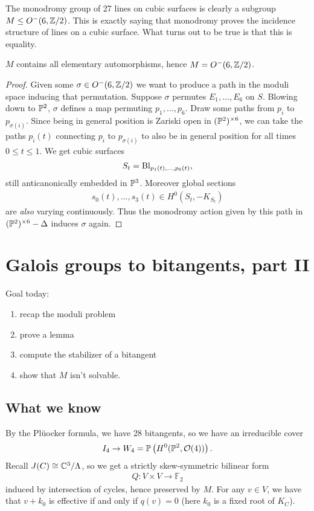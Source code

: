 \documentclass[11pt]{amsart}
\begin{document}
The monodromy group of 27 lines on cubic surfaces is clearly a subgroup $M \le O^-(6,\Z/2)$. This is exactly saying that monodromy proves the incidence structure of lines on a cubic surface. What turns out to be true is that this is equality.

\begin{theorem} $M$ contains all elementary automorphisms, hence $M = O^-(6,\Z/2)$.
\end{theorem}
\begin{proof} Given some $\sigma \in O^-(6,\Z/2)$ we want to produce a path in the moduli space inducing that permutation. Suppose $\sigma$ permutes $E_1, \ldots, E_6$ on $S$. Blowing down to $\P^2$, $\sigma$ defines a map permuting $p_1, \ldots, p_6$. Draw some paths from $p_i$ to $p_{\sigma(i)}$. Since being in general position is Zariski open in $(\P^2)^{\times6}$, we can take the paths $p_i(t)$ connecting $p_i$ to $p_{\sigma(i)}$ to also be in general position for all times $0\le t \le 1$. We get cubic surfaces
\begin{align*}
    S_t = \Bl_{p_1(t), \ldots, p_6(t)},
\end{align*}
still anticanonically embedded in $\P^3$. Moreover global sections 
\begin{align*}
    s_0(t), \ldots, s_3(t) \in H^0(S_t, -K_{S_t})
\end{align*}
are \textit{also} varying continuously. Thus the monodromy action given by this path in $(\P^2)^{\times6}-\Delta$ induces $\sigma$ again.
\end{proof}


\section{Galois groups to bitangents, part II}

Goal today:
\begin{enumerate}
    \item recap the moduli problem
    \item prove a lemma
    \item compute the stabilizer of a bitangent
    \item show that $M$ isn't solvable.
\end{enumerate}

\subsection{What we know}

By the Pl\"{u}ocker formula, we have 28 bitangents, so we have an irreducible cover
\begin{align*}
    I_4 \to W_4 = \mathbb{P} \left( H^0(\P^2, \O(4)) \right).
\end{align*}
Recall $J(C)\cong \C^3/\Lambda$, so we get a strictly skew-symmetric bilinear form
\begin{align*}
    Q \colon V \times V \to \mathbb{F}_2
\end{align*}
induced by intersection of cycles, hence preserved by $M$. For any $v\in V$, we have that $v + k_0$ is effective if and only if $q(v) = 0$ (here $k_0$ is a fixed root of $K_C$).
\end{document}
